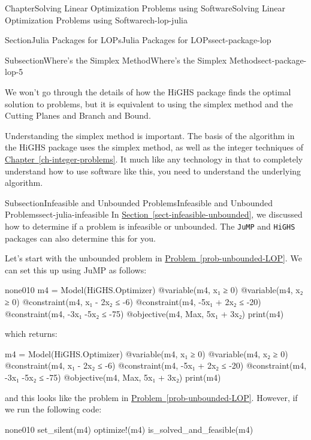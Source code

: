\documentclass[oneside,10pt,]{book}
\newcommand{\xreffont}{\relax}
\newcommand{\mono}[1]{\texttt{#1}}
\numberwithin{equation}{section}
\begin{document}
\begin{chapterptx}{Chapter}{Solving Linear Optimization Problems using Software}{}{Solving Linear Optimization Problems using Software}{}{}{ch-lop-julia}
\begin{sectionptx}{Section}{Julia Packages for LOPs}{}{Julia Packages for LOPs}{}{}{sect-package-lop}
\begin{subsectionptx}{Subsection}{Where's the Simplex Method}{}{Where's the Simplex Method}{}{}{sect-package-lop-5}
\par
We won't go through the details of how the HiGHS package finds the optimal solution to problems, but it is equivalent to using the simplex method and the Cutting Planes and Branch and Bound.%
\par
Understanding the simplex method is important. The basis of the algorithm in the HiGHS package uses the simplex method, as well as the integer techniques of \hyperref[ch-integer-problems]{Chapter~{\xreffont\ref{ch-integer-problems}}}. It much like any technology in that to completely understand how to use software like this, you need to understand the underlying algorithm.%
\end{subsectionptx}
%
%
\typeout{************************************************}
\typeout{************************************************}
%
\begin{subsectionptx}{Subsection}{Infeasible and Unbounded Problems}{}{Infeasible and Unbounded Problems}{}{}{sect-julia-infeasible}
In \hyperref[sect-infeasible-unbounded]{Section~{\xreffont\ref{sect-infeasible-unbounded}}}, we discussed how to determine if a problem is infeasible or unbounded. The \mono{JuMP} and \mono{HiGHS} packages can also determine this for you.%
\par
Let's start with the unbounded problem in \hyperref[prob-unbounded-LOP]{Problem~{\xreffont\ref{prob-unbounded-LOP}}}. We can set this up using JuMP as follows:%
\begin{program}{none}{0}{1}{0}
m4 = Model(HiGHS.Optimizer)
@variable(m4, x₁ ≥ 0)
@variable(m4, x₂ ≥ 0)
@constraint(m4, x₁ - 2x₂ ≤ -6)
@constraint(m4, -5x₁ + 2x₂ ≤ -20)
@constraint(m4, -3x₁ -5x₂ ≤ -75)
@objective(m4, Max, 5x₁ + 3x₂)
print(m4)
\end{program}
which returns:%
\par
%
\begin{codedisplay}
m4 = Model(HiGHS.Optimizer)
@variable(m4, x₁ ≥ 0)
@variable(m4, x₂ ≥ 0)
@constraint(m4, x₁ - 2x₂ ≤ -6)
@constraint(m4, -5x₁ + 2x₂ ≤ -20)
@constraint(m4, -3x₁ -5x₂ ≤ -75)
@objective(m4, Max, 5x₁ + 3x₂)
print(m4)
\end{codedisplay}
%
\par
and this looks like the problem in \hyperref[prob-unbounded-LOP]{Problem~{\xreffont\ref{prob-unbounded-LOP}}}. However, if we run the following code:%
\begin{program}{none}{0}{1}{0}
set_silent(m4)
optimize!(m4)
is_solved_and_feasible(m4)
\end{program}

\end{subsectionptx}
\end{sectionptx}
\end{chapterptx}
\end{document}
